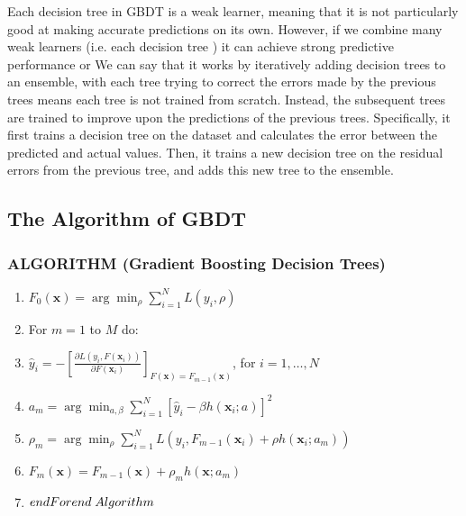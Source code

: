 \documentclass[12pt]{article}
\begin{document}
Each decision tree in GBDT is a weak learner, meaning that it is not particularly good at making accurate predictions on its own. However, if we combine many weak learners (i.e. each decision tree ) it can achieve strong predictive performance or We can say that it works by iteratively adding decision trees to an ensemble, with each tree trying to correct the errors made by the previous trees means each tree is not trained from scratch. Instead, the subsequent trees are trained to improve upon the predictions of the previous trees. Specifically, it first trains a decision tree on the dataset and calculates the error between the predicted and actual values. Then, it trains a new decision tree on the residual errors from the previous tree, and adds this new tree to the ensemble.\\

\subsection{The Algorithm of GBDT}
\subsubsection*{ALGORITHM  (Gradient Boosting Decision Trees)}

\begin{enumerate}
    \item \( F_0(\mathbf{x}) = \arg\min_\rho \sum_{i=1}^{N} L(y_i, \rho) \)
    \item For \( m = 1 \) to \( M \) do:
    \item \( \hat{y}_i = -\left[ \frac{\partial L(y_i, F(\mathbf{x}_i))}{\partial F(\mathbf{x}_i)} \right]_{F(\mathbf{x})=F_{m-1}(\mathbf{x})} \), for \( i = 1, \ldots, N \)
    \item \( a_m = \arg\min_{a, \beta} \sum_{i=1}^{N}[\hat{y}_i - \beta h(\mathbf{x}_i; a)]^2 \)
    \item \( \rho_m = \arg\min_{\rho} \sum_{i=1}^{N} L(y_i, F_{m-1}(\mathbf{x}_i) + \rho h(\mathbf{x}_i; a_m)) \)
    \item \( F_m(\mathbf{x}) = F_{m-1}(\mathbf{x}) + \rho_m h(\mathbf{x}; a_m) \)
    \item \(endFor\\
    end \; Algorithm\)
\end{enumerate}
\end{document}

